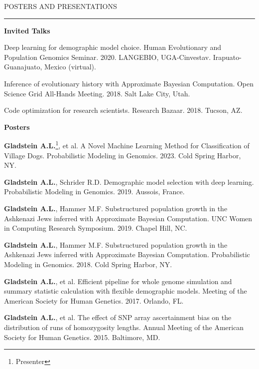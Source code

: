 \documentclass{resume} %
\renewenvironment{rSection}[1]{
\sectionskip
\textcolor{RoyalPurple}{\MakeUppercase{#1}}
\sectionlineskip
\hrule
\begin{list}{}{
\setlength{\leftmargin}{1.5em}
}
\item[]
}{
\end{list}
}
\begin{document}
\begin{rSection}{Posters and Presentations}

\textbf{Invited Talks}
\item  Deep learning for demographic model choice. Human Evolutionary and Population Genomics Seminar. 2020. LANGEBIO, UGA-Cinvestav. Irapuato-Guanajuato, Mexico (virtual).

\item Inference of evolutionary history with Approximate Bayesian Computation. Open Science Grid All-Hands Meeting. 2018. Salt Lake City, Utah.

\item Code optimization for research scientists. Research Bazaar. 2018. Tucson, AZ.

\textbf{Posters}

\item \textbf{Gladstein A.L.}\footnote{Presenter}, et al. A Novel Machine Learning Method for Classification of Village Dogs.  Probabilistic Modeling in Genomics. 2023. Cold Spring Harbor, NY.

\item \textbf{Gladstein A.L.}\textsuperscript{\textdagger}, Schrider R.D.  Demographic model selection with deep learning.  Probabilistic Modeling in Genomics. 2019. Aussois, France.

\item \textbf{Gladstein A.L.}\textsuperscript{\textdagger}, Hammer M.F. Substructured population growth in the Ashkenazi Jews inferred with Approximate Bayesian Computation. UNC Women in Computing Research Symposium. 2019. Chapel Hill, NC.

\item \textbf{Gladstein A.L.}\textsuperscript{\textdagger}, Hammer M.F. Substructured population growth in the Ashkenazi Jews inferred with Approximate Bayesian Computation. Probabilistic Modeling in Genomics. 2018. Cold Spring Harbor, NY.

\item \textbf{Gladstein A.L.}\textsuperscript{\textdagger}, et al. Efficient pipeline for whole genome simulation and summary statistic calculation with flexible demographic models. Meeting of the American Society for Human Genetics. 2017. Orlando, FL.

\item \textbf{Gladstein A.L.}\textsuperscript{\textdagger}, et al. The effect of SNP array ascertainment bias on the distribution of runs of homozygosity lengths. Annual Meeting of the American Society for Human Genetics. 2015. Baltimore, MD. 

\end{rSection}
\end{document}
